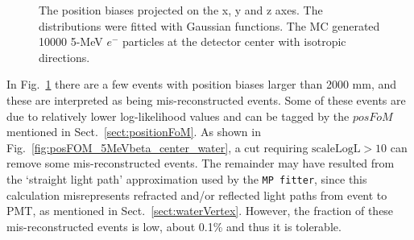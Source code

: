 \begin{figure}[htbp]
{\begin{minipage}[b]{0.4\textwidth}
		\end{minipage}
	}
	\caption[The position biases projected on the x, y and z axes.]{The position biases projected on the x, y and z axes. The distributions were fitted with Gaussian functions. The MC generated 10000 5-MeV $e^-$ particles at the detector center with isotropic directions.\label{fig:5MeVbeta_center_water}}
\end{figure}

In Fig.~\ref{fig:5MeVbeta_center_water} there are a few events with position biases larger than 2000 mm, and these are interpreted as being mis-reconstructed events. Some of these events are due to relatively lower log-likelihood values and can be tagged by the $posFoM$ mentioned in Sect.~\ref{sect:positionFoM}. As shown in Fig.~\ref{fig:posFOM_5MeVbeta_center_water}, a cut requiring $\mathrm{scaleLogL}>10$ can remove some mis-reconstructed events. The remainder may have resulted from the `straight light path' approximation used by the \texttt{MP fitter}, since this calculation misrepresents refracted and/or reflected light paths from event to PMT, as mentioned in Sect.~\ref{sect:waterVertex}. However, the fraction of these mis-reconstructed events is low, about 0.1\% and thus it is tolerable.

